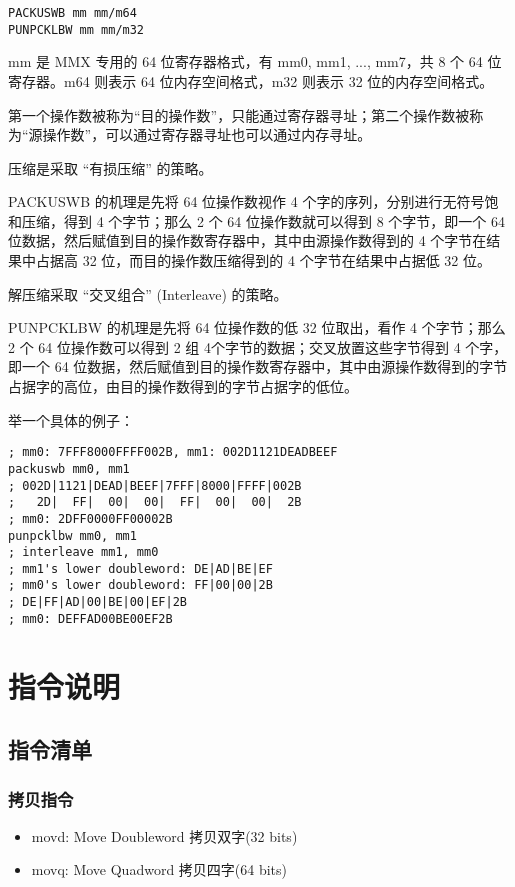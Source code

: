 \begin{lstlisting}
PACKUSWB mm mm/m64
PUNPCKLBW mm mm/m32
\end{lstlisting}

mm 是 MMX 专用的 64 位寄存器格式，有 mm0, mm1, ..., mm7，共 8 个 64 位寄存器。m64 则表示 64 位内存空间格式，m32 则表示 32 位的内存空间格式。

第一个操作数被称为“目的操作数”，只能通过寄存器寻址；第二个操作数被称为“源操作数”，可以通过寄存器寻址也可以通过内存寻址。

压缩是采取 “有损压缩” 的策略。

PACKUSWB 的机理是先将 64 位操作数视作 4 个字的序列，分别进行无符号饱和压缩，得到 4 个字节；那么 2 个 64 位操作数就可以得到 8 个字节，即一个 64 位数据，然后赋值到目的操作数寄存器中，其中由源操作数得到的 4 个字节在结果中占据高 32 位，而目的操作数压缩得到的 4 个字节在结果中占据低 32 位。

解压缩采取 “交叉组合” (Interleave) 的策略。

PUNPCKLBW 的机理是先将 64 位操作数的低 32 位取出，看作 4 个字节；那么 2 个 64 位操作数可以得到 2 组 4个字节的数据；交叉放置这些字节得到 4 个字，即一个 64 位数据，然后赋值到目的操作数寄存器中，其中由源操作数得到的字节占据字的高位，由目的操作数得到的字节占据字的低位。

举一个具体的例子：

\begin{lstlisting}[language={[x86masm]Assembler}]
; mm0: 7FFF8000FFFF002B, mm1: 002D1121DEADBEEF
packuswb mm0, mm1
; 002D|1121|DEAD|BEEF|7FFF|8000|FFFF|002B
;   2D|  FF|  00|  00|  FF|  00|  00|  2B
; mm0: 2DFF0000FF00002B
punpcklbw mm0, mm1
; interleave mm1, mm0
; mm1's lower doubleword: DE|AD|BE|EF
; mm0's lower doubleword: FF|00|00|2B
; DE|FF|AD|00|BE|00|EF|2B
; mm0: DEFFAD00BE00EF2B
\end{lstlisting}


\section{指令说明}

\subsection{指令清单}

\subsubsection{拷贝指令}

\begin{itemize}
    \item movd: Move Doubleword 拷贝双字(32 bits)
    \item movq: Move Quadword 拷贝四字(64 bits)
\end{itemize}

